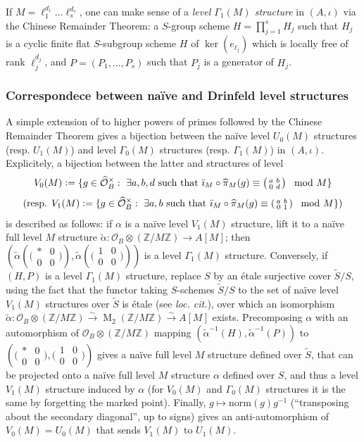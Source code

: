 \documentclass[a4paper]{amsart}
\numberwithin{equation}{section}
\theoremstyle{definition}
\newcommand{\Z}{\mathbb{Z}}
\newcommand{\defeq}{\vcentcolon=}
\DeclareMathOperator{\M}{M}
\newcommand{\norm}{\mathrm{norm}}
\newcommand{\smallmat}[4]{\bigl(\begin{smallmatrix}#1&#2\\#3&#4\end{smallmatrix}\bigr)}
\begin{document}
If $M=\ell_1^{d_1}\dots\ell_s^{d_s}$, one can make sense of a \textit{level $\Gamma_1(M)$ structure} in $(A,\iota)$ via the Chinese Remainder Theorem: a $S$-group scheme $H=\prod_{j=1}^sH_j$ such that $H_j$ is a cyclic finite flat $S$-subgroup scheme $H$ of $\ker(e_{\ell_j})$ which is locally free of rank $\ell_j^{d_j}$, and $P=(P_1,\dots,P_s)$ such that $P_j$ is a generator of $H_j$.

\subsubsection{Correspondece between naïve and Drinfeld level structures}
A simple extension of \cite[Lemma 4.4]{Buzzard} to higher powers of primes followed by the Chinese Remainder Theorem gives a bijection between the naïve level $U_0(M)$ structures (resp. $U_1(M)$) and level $\Gamma_0(M)$ structures (resp. $\Gamma_1(M)$) in $(A,\iota)$. Explicitely, a bijection between the latter and structures of level \[V_0(M)\defeq\{g\in\widehat{\mathcal{O}}_B^\times:\ \exists a,b,d\text{ such that } \bar{\imath}_M\circ\widehat{\pi}_M(g)\equiv\left(\begin{smallmatrix}a & b \\ 0 & d\end{smallmatrix}\right)\mod M\}\]\[\text{(resp. }V_1(M)\defeq\{g\in\widehat{\mathcal{O}}_B^\times:\ \exists a,b\text{ such that } \bar{\imath}_M\circ\widehat{\pi}_M(g)\equiv\left(\begin{smallmatrix}a & b \\ 0 & 1\end{smallmatrix}\right)\mod M\}\text{)}\] is described as follows: if $\alpha$ is a naïve level $V_1(M)$ structure, lift it to a naïve full level $M$ structure $\widetilde{\alpha}\colon\mathcal{O}_B\otimes (\Z/M\Z)\to A[M]$; then $\left(\widetilde{\alpha}\left(\smallmat{\ast}{0}{0}{0}\right),\widetilde{\alpha}\left(\smallmat{1}{0}{0}{0}\right)\right)$ is a level $\Gamma_1(M)$ structure. Conversely, if $(H,P)$ is a level $\Gamma_1(M)$ structure, replace $S$ by an étale surjective cover $\widetilde{S}/S$, using the fact that the functor taking $S$-schemes $\widetilde{S}/S$ to the set of naïve level $V_1(M)$ structures over $\widetilde{S}$ is étale (see \textit{loc. cit.}), over which an isomorphism $\widetilde{\alpha}\colon\mathcal{O}_B\otimes (\Z/M\Z)\stackrel{\sim}{\to}\M_2(\Z/M\Z)\stackrel{\sim}{\to} A[M]$ exists. Precomposing $\alpha$ with an automorphism of $\mathcal{O}_B\otimes (\Z/M\Z)$ mapping $(\widetilde{\alpha}^{-1}(H),\widetilde{\alpha}^{-1}(P))$ to $\left(\smallmat{\ast}{0}{0}{0},\smallmat{1}{0}{0}{0}\right)$ gives a naïve full level $M$ structure defined over $\widetilde{S}$, that can be projected onto a naïve full level $M$ structure $\alpha$ defined over $S$, and thus a level $V_1(M)$ structure induced by $\alpha$ (for $V_0(M)$ and $\Gamma_0(M)$ structures it is the same by forgetting the marked point). Finally, $g\mapsto\norm(g)g^{-1}$ (``transposing about the secondary diagonal'', up to signs) gives an anti-automorphism of $V_0(M)=U_0(M)$ that sends $V_1(M)$ to $U_1(M)$.
\end{document}
